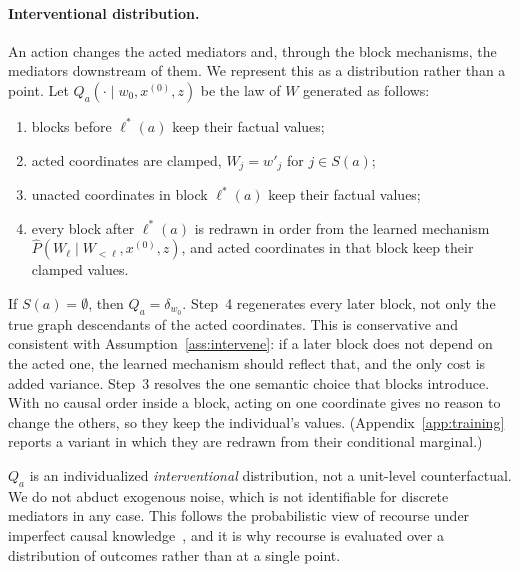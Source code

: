 \paragraph{Interventional distribution.}
An action changes the acted mediators and, through the block mechanisms, the
mediators downstream of them. We represent this as a distribution rather than
a point. Let $Q_a(\cdot\mid w_0,x^{(0)},z)$ be the law of $W$ generated as
follows:
\begin{enumerate}[nosep]
  \item blocks before $\ell^*(a)$ keep their factual values;
  \item acted coordinates are clamped, $W_j=w'_j$ for $j\in S(a)$;
  \item unacted coordinates in block $\ell^*(a)$ keep their factual values;
  \item every block after $\ell^*(a)$ is redrawn in order from the learned
        mechanism $\hat P(W_\ell\mid W_{<\ell},x^{(0)},z)$, and acted coordinates
        in that block keep their clamped values.
\end{enumerate}
If $S(a)=\emptyset$, then $Q_a=\delta_{w_0}$. Step~4 regenerates every later
block, not only the true graph descendants of the acted coordinates. This is
conservative and consistent with Assumption~\ref{ass:intervene}: if a later
block does not depend on the acted one, the learned mechanism should reflect
that, and the only cost is added variance. Step~3 resolves the one semantic
choice that blocks introduce. With no causal order inside a block, acting on
one coordinate gives no reason to change the others, so they keep the
individual's values. (Appendix~\ref{app:training} reports a variant in which
they are redrawn from their conditional marginal.)

$Q_a$ is an individualized \emph{interventional} distribution, not a
unit-level counterfactual. We do not abduct exogenous noise, which is not
identifiable for discrete mediators in any case. This follows the
probabilistic view of recourse under imperfect causal
knowledge~\citep{karimi2020imperfect}, and it is why recourse is evaluated over
a distribution of outcomes rather than at a single point.

